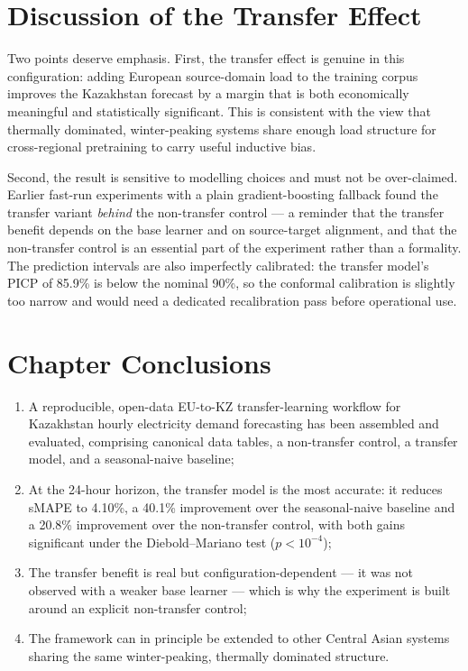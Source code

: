 \section{Discussion of the Transfer Effect}
\label{sec:ml_comparison}

Two points deserve emphasis. First, the transfer effect is genuine in this configuration: adding European source-domain load to the training corpus improves the Kazakhstan forecast by a margin that is both economically meaningful and statistically significant. This is consistent with the view that thermally dominated, winter-peaking systems share enough load structure for cross-regional pretraining to carry useful inductive bias.

Second, the result is sensitive to modelling choices and must not be over-claimed. Earlier fast-run experiments with a plain gradient-boosting fallback found the transfer variant \emph{behind} the non-transfer control --- a reminder that the transfer benefit depends on the base learner and on source-target alignment, and that the non-transfer control is an essential part of the experiment rather than a formality. The prediction intervals are also imperfectly calibrated: the transfer model's PICP of 85.9\% is below the nominal 90\%, so the conformal calibration is slightly too narrow and would need a dedicated recalibration pass before operational use.

\section{Chapter Conclusions}
\label{sec:ml_conclusions}

\begin{enumerate}
    \item A reproducible, open-data EU-to-KZ transfer-learning workflow for Kazakhstan hourly electricity demand forecasting has been assembled and evaluated, comprising canonical data tables, a non-transfer control, a transfer model, and a seasonal-naive baseline;
    \item At the 24-hour horizon, the transfer model is the most accurate: it reduces sMAPE to 4.10\%, a 40.1\% improvement over the seasonal-naive baseline and a 20.8\% improvement over the non-transfer control, with both gains significant under the Diebold--Mariano test ($p < 10^{-4}$);
    \item The transfer benefit is real but configuration-dependent --- it was not observed with a weaker base learner --- which is why the experiment is built around an explicit non-transfer control;
    \item The framework can in principle be extended to other Central Asian systems sharing the same winter-peaking, thermally dominated structure.
\end{enumerate}

